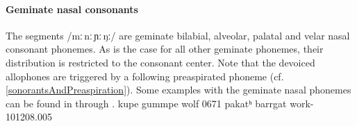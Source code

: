 \paragraph{Geminate nasal consonants}
The segments /mː\,nː\,ɲː\,ŋː/ are geminate bilabial, alveolar, palatal and velar nasal consonant phonemes. 
As is the case for all other geminate phonemes, their distribution is restricted to the consonant center. 
Note that the devoiced allophones are triggered by a following preaspirated phoneme (cf. \SEC\ref{sonorantsAndPreaspiration}). 
Some examples with the geminate nasal phonemes can be found in  through .
	{kupe}	{gummpe}	{wolf\BS{}}		{0671}
	{pakatʰ}	{barrgat}	{work-}			{101208}{.005}



